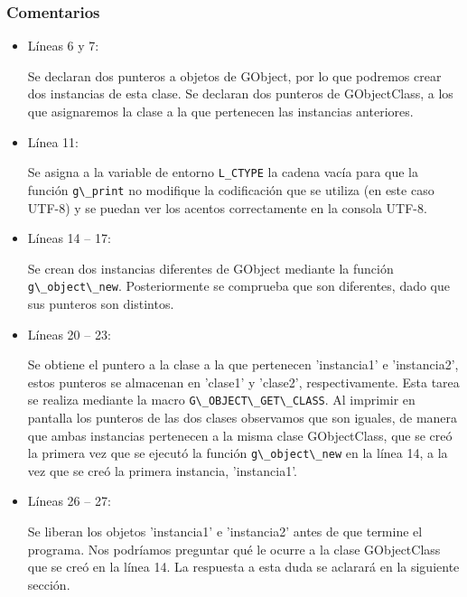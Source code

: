 \subsubsection{Comentarios}
\begin{itemize}
\item Líneas 6 y 7:\par
  Se declaran dos punteros a objetos de \textsf{GObject}, por lo que podremos crear dos
  instancias de esta clase.
  Se declaran dos punteros de \textsf{GObjectClass}, a los que asignaremos la clase a la que pertenecen
  las instancias anteriores.
\item Línea 11:\par
  Se asigna a la variable de entorno \texttt{L\_CTYPE} la cadena vacía para que la función
  \passthrough{\lstinline!g\_print!} no modifique la codificación que se utiliza (en este caso UTF-8)
  y se puedan ver los acentos correctamente en la consola UTF-8.
\item Líneas 14 -- 17:\par
  Se crean dos instancias diferentes de \textsf{GObject} mediante la función 
  \passthrough{\lstinline!g\_object\_new!}. Posteriormente se comprueba que son diferentes, dado que
  sus punteros son distintos.
\item Líneas 20 -- 23:\par
  Se obtiene el puntero a la clase a la que pertenecen 'instancia1' e 'instancia2', estos punteros se
  almacenan en 'clase1' y 'clase2', respectivamente. Esta tarea se realiza mediante la macro
  \passthrough{\lstinline!G\_OBJECT\_GET\_CLASS!}. Al imprimir en pantalla los punteros de las
  dos clases observamos que son iguales, de manera que ambas instancias pertenecen a la misma
  clase \textsf{GObjectClass}, que se creó la primera vez que se ejecutó la función
  \passthrough{\lstinline!g\_object\_new!} en la línea 14, a la vez que se creó la primera instancia,
  'instancia1'.
\item Líneas 26 -- 27:\par
  Se liberan los objetos 'instancia1' e 'instancia2' antes de que termine el programa. Nos podríamos
  preguntar qué le ocurre a la clase \textsf{GObjectClass} que se creó en la línea 14. La respuesta a
  esta duda se aclarará en la siguiente sección.
\end{itemize}

